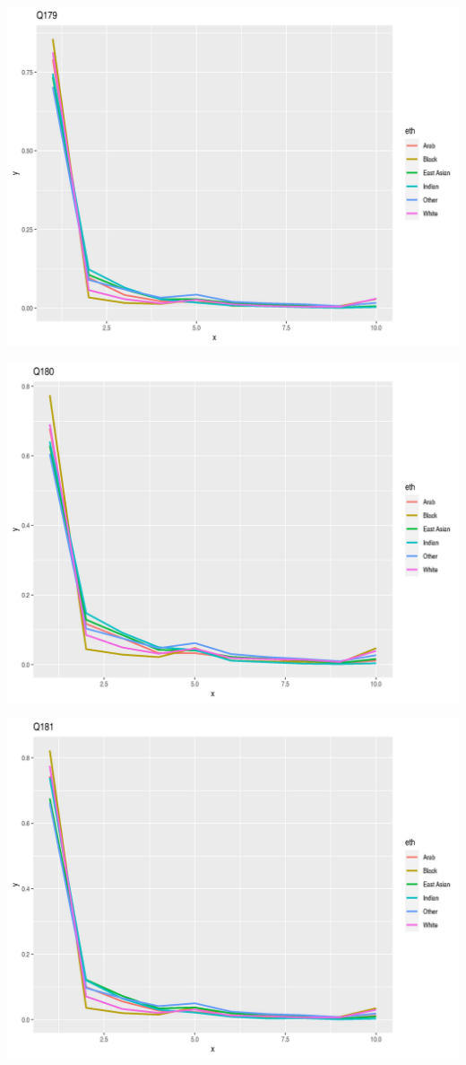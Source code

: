 \documentclass{amsart}
\begin{document}
\includegraphics[scale=0.7]{q179.jpeg}

\includegraphics[scale=0.7]{q180.jpeg}

\includegraphics[scale=0.7]{q181.jpeg}
\end{document}
